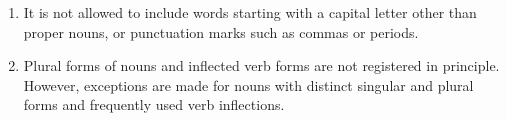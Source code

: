\documentclass[b5j,10pt]{tetsujsarticle}%
\begin{document}
\warningbox%
  {%
    \begin{enumerate}[・]
      \item It is not allowed to include words starting with a capital letter other than proper nouns, or punctuation marks such as commas or periods.
      \item Plural forms of nouns and inflected verb forms are not registered in principle. However, exceptions are made for nouns with distinct singular and plural forms and frequently used verb inflections.
    \end{enumerate}
  }
\end{document}
